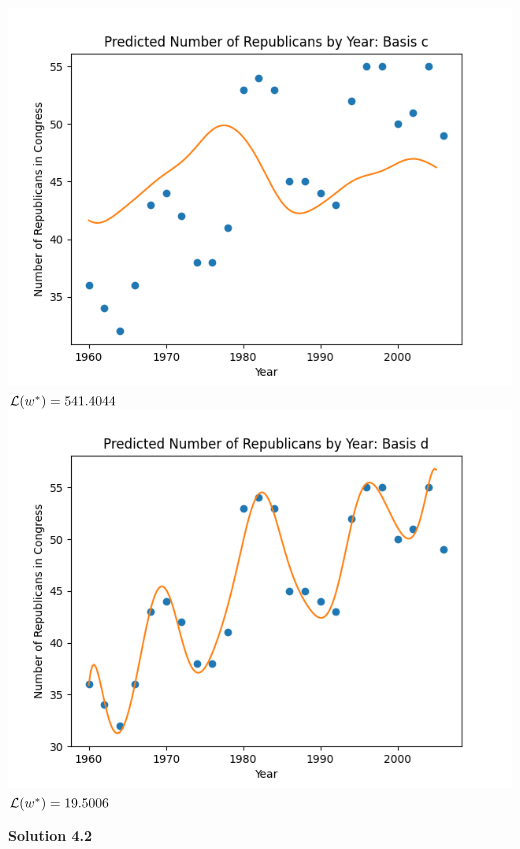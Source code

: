 \documentclass[submit]{harvardml}
\begin{document}
\includegraphics[scale=0.75]{yearc.png}\\

\textbf{$\mathcal{L}(w^*) = 541.4044$} \\

\includegraphics[scale=0.75]{yeard.png}\\

\textbf{$\mathcal{L}(w^*) = 19.5006$} \\

\newpage

\noin \textbf{Solution 4.2}
\end{document}
